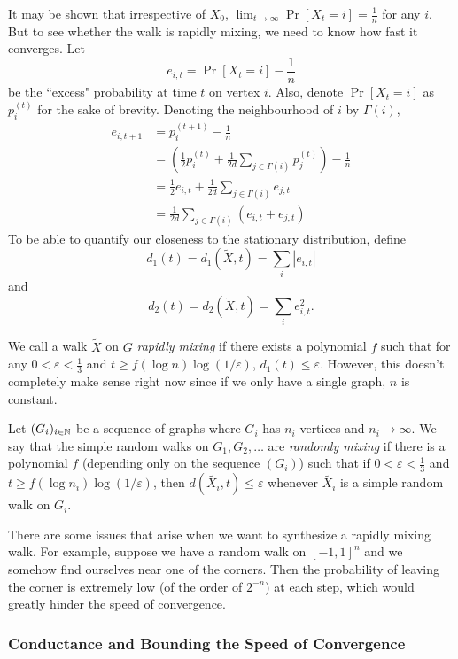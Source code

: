 It may be shown that irrespective of $X_0$, $\lim_{t\to\infty}\Pr[X_t=i] = \frac{1}{n}$ for any $i$. But to see whether the walk is rapidly mixing, we need to know how fast it converges. Let
\[ e_{i,t} = \Pr[X_t=i] - \frac{1}{n} \]
be the ``excess" probability at time $t$ on vertex $i$. Also, denote $\Pr[X_t=i]$ as $p_i^{(t)}$ for the sake of brevity. Denoting the neighbourhood of $i$ by $\Gamma(i)$,
\begin{align}
    e_{i,t+1} &= p_i^{(t+1)} - \frac{1}{n} \nonumber \\
    &= \left(\frac{1}{2}p_i^{(t)} + \frac{1}{2d}\sum_{j\in\Gamma(i)}p_j^{(t)}\right) - \frac{1}{n} \nonumber \\
    &= \frac{1}{2}e_{i,t} + \frac{1}{2d}\sum_{j\in\Gamma(i)}e_{j,t} \nonumber \\
    &= \frac{1}{2d} \sum_{j\in\Gamma(i)}(e_{i,t}+e_{j,t}) \label{eqn: alternate expression for future error}
\end{align}
To be able to quantify our closeness to the stationary distribution, define
\[d_1(t)=d_1(\tilde{X},t) = \sum_{i}|e_{i,t}|\]
and
\[d_2(t)=d_2(\tilde{X},t) = \sum_{i}e_{i,t}^2.\]

We call a walk $\tilde{X}$ on $G$ \textit{rapidly mixing} if there exists a polynomial $f$ such that for any $0<\varepsilon<\frac{1}{3}$ and $t\geq f(\log n)\log(1/\varepsilon)$, $d_1(t)\leq\varepsilon$. However, this doesn't completely make sense right now since if we only have a single graph, $n$ is constant.

\begin{fdef}
\label{def: rapidly mixing random walks}
Let $(G_i)_{i\in\mathbb{N}}$ be a sequence of graphs where $G_i$ has $n_i$ 
vertices and $n_i\to\infty$. We say that the simple random walks on $G_1,G_2,\ldots$ are \textit{randomly mixing} if there is a polynomial $f$ (depending only on the sequence $(G_i)$) such that if $0<\varepsilon<\frac{1}{3}$ and $t\geq f(\log n_i)\log(1/\varepsilon)$, then $d(\tilde{X_i},t)\leq\varepsilon$ whenever $\tilde{X_i}$ is a simple random walk on $G_i$.
\end{fdef}

There are some issues that arise when we want to synthesize a rapidly mixing walk. For example, suppose we have a random walk on $[-1,1]^n$ and we somehow find ourselves near one of the corners. Then the probability of leaving the corner is extremely low (of the order of $2^{-n}$) at each step, which would greatly hinder the speed of convergence.

\subsubsection{Conductance and Bounding the Speed of Convergence}

